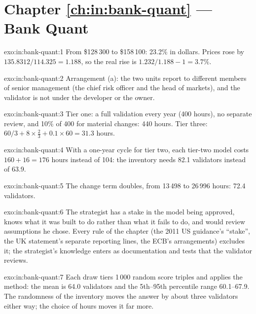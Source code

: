 \section*{Chapter \ref{ch:in:bank-quant} --- Bank Quant}

\begin{solution}{exo:in:bank-quant:1}
From \$128\,300 to \$158\,100: 23.2\% in dollars. Prices rose by $135.8312/114.325=1.188$, so the real rise is
$1.232/1.188-1=3.7\%$.
\end{solution}

\begin{solution}{exo:in:bank-quant:2}
Arrangement (a): the two units report to different members of senior management (the chief risk officer and the head of
markets), and the validator is not under the developer or the owner.
\end{solution}

\begin{solution}{exo:in:bank-quant:3}
Tier one: a full validation every year (400 hours), no separate review, and 10\% of 400 for material changes: 440 hours.
Tier three: $60/3+8\times\frac23+0.1\times60=31.3$ hours.
\end{solution}

\begin{solution}{exo:in:bank-quant:4}
With a one-year cycle for tier two, each tier-two model costs $160+16=176$ hours instead of 104: the inventory needs 82.1
validators instead of 63.9.
\end{solution}

\begin{solution}{exo:in:bank-quant:5}
The change term doubles, from 13\,498 to 26\,996 hours: 72.4 validators.
\end{solution}

\begin{solution}{exo:in:bank-quant:6}
The strategist has a stake in the model being approved, knows what it was built to do rather than what it fails to do,
and would review assumptions he chose. Every rule of the chapter (the 2011 US guidance's ``stake'', the UK statement's
separate reporting lines, the ECB's arrangements) excludes it; the strategist's knowledge enters as documentation and
tests that the validator reviews.
\end{solution}

\begin{solution}{exo:in:bank-quant:7}
Each draw tiers 1\,000 random score triples and applies the method: the mean is 64.0 validators and the 5th--95th
percentile range 60.1--67.9. The randomness of the inventory moves the answer by about three validators either way;
the choice of hours moves it far more.
\end{solution}

